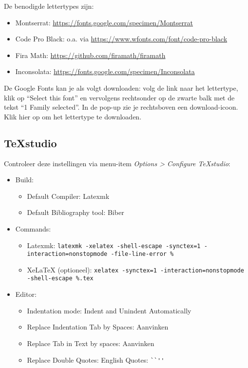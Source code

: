De benodigde lettertypes zijn:

\begin{itemize}
  \item Montserrat: \url{https://fonts.google.com/specimen/Montserrat}
  \item Code Pro Black: o.a. via \url{https://www.wfonts.com/font/code-pro-black}
  \item Fira Math: \url{https://github.com/firamath/firamath}
  \item Inconsolata: \url{https://fonts.google.com/specimen/Inconsolata}
\end{itemize}

De Google Fonts kan je als volgt downloaden: volg de link naar het lettertype, klik op ``Select this font'' en vervolgens rechtsonder op de zwarte balk met de tekst ``1 Family selected''. In de pop-up zie je rechtsboven een download-icoon. Klik hier op om het lettertype te downloaden.

\subsection{TeXstudio}

Controleer deze instellingen via menu-item \emph{Options > Configure TeXstudio}:

\begin{itemize}
  \item Build:
  \begin{itemize}
    \item Default Compiler: Latexmk
    \item Default Bibliography tool: Biber
  \end{itemize}
  \item Commands:
  \begin{itemize}
    \item Latexmk: \texttt{latexmk -xelatex -shell-escape -synctex=1 -interaction=nonstopmode -file-line-error \%}
    \item XeLaTeX (optioneel): \texttt{xelatex -synctex=1 -interaction=nonstopmode -shell-escape \%.tex}
  \end{itemize}
  \item Editor:
  \begin{itemize}
    \item Indentation mode: Indent and Unindent Automatically
    \item Replace Indentation Tab by Spaces: Aanvinken
    \item Replace Tab in Text by spaces: Aanvinken
    \item Replace Double Quotes: English Quotes: \verb|``''|
  \end{itemize}

\end{itemize}

